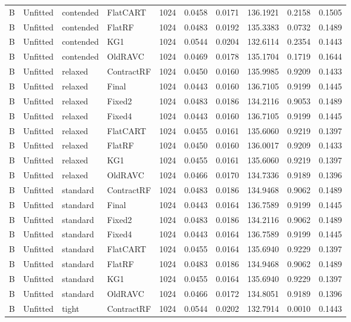 \begin{longtable}{@{}llllllllll@{}}
B & Unfitted & contended & FlatCART & 1024 & 0.0458 & 0.0171 & 136.1921 & 0.2158 & 0.1505\\
B & Unfitted & contended & FlatRF & 1024 & 0.0483 & 0.0192 & 135.3383 & 0.0732 & 0.1489\\
B & Unfitted & contended & KG1 & 1024 & 0.0544 & 0.0204 & 132.6114 & 0.2354 & 0.1443\\
B & Unfitted & contended & OldRAVC & 1024 & 0.0469 & 0.0178 & 135.1704 & 0.1719 & 0.1644\\
B & Unfitted & relaxed & ContractRF & 1024 & 0.0450 & 0.0160 & 135.9985 & 0.9209 & 0.1433\\
B & Unfitted & relaxed & Final & 1024 & 0.0443 & 0.0160 & 136.7105 & 0.9199 & 0.1445\\
B & Unfitted & relaxed & Fixed2 & 1024 & 0.0483 & 0.0186 & 134.2116 & 0.9053 & 0.1489\\
B & Unfitted & relaxed & Fixed4 & 1024 & 0.0443 & 0.0160 & 136.7105 & 0.9199 & 0.1445\\
B & Unfitted & relaxed & FlatCART & 1024 & 0.0455 & 0.0161 & 135.6060 & 0.9219 & 0.1397\\
B & Unfitted & relaxed & FlatRF & 1024 & 0.0450 & 0.0160 & 136.0017 & 0.9209 & 0.1433\\
B & Unfitted & relaxed & KG1 & 1024 & 0.0455 & 0.0161 & 135.6060 & 0.9219 & 0.1397\\
B & Unfitted & relaxed & OldRAVC & 1024 & 0.0466 & 0.0170 & 134.7336 & 0.9189 & 0.1396\\
B & Unfitted & standard & ContractRF & 1024 & 0.0483 & 0.0186 & 134.9468 & 0.9062 & 0.1489\\
B & Unfitted & standard & Final & 1024 & 0.0443 & 0.0164 & 136.7589 & 0.9199 & 0.1445\\
B & Unfitted & standard & Fixed2 & 1024 & 0.0483 & 0.0186 & 134.2116 & 0.9062 & 0.1489\\
B & Unfitted & standard & Fixed4 & 1024 & 0.0443 & 0.0164 & 136.7589 & 0.9199 & 0.1445\\
B & Unfitted & standard & FlatCART & 1024 & 0.0455 & 0.0164 & 135.6940 & 0.9229 & 0.1397\\
B & Unfitted & standard & FlatRF & 1024 & 0.0483 & 0.0186 & 134.9468 & 0.9062 & 0.1489\\
B & Unfitted & standard & KG1 & 1024 & 0.0455 & 0.0164 & 135.6940 & 0.9229 & 0.1397\\
B & Unfitted & standard & OldRAVC & 1024 & 0.0466 & 0.0172 & 134.8051 & 0.9189 & 0.1396\\
B & Unfitted & tight & ContractRF & 1024 & 0.0544 & 0.0202 & 132.7914 & 0.0010 & 0.1443\\

\end{longtable}
